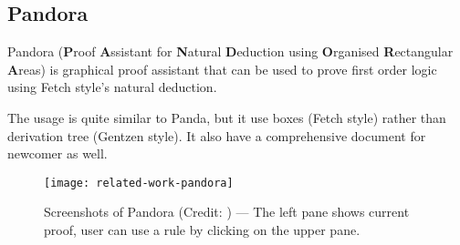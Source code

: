 \documentclass[master.tex]{subfiles}
\begin{document}
\newpage

\subsection{Pandora}
Pandora\supercite{pandora-official-website}\supercite{Broda2007PandoraAR}
(\textbf{P}roof \textbf{A}ssistant for \textbf{N}atural \textbf{D}eduction using
\textbf{O}rganised \textbf{R}ectangular \textbf{A}reas) is graphical proof
assistant that can be used to prove first order logic using Fetch style's
natural deduction.

The usage is quite similar to Panda, but it use boxes (Fetch style) rather than
derivation tree (Gentzen style). It also have a comprehensive document for
newcomer as well.

\begin{figure}[H]
    \centering
    \texttt{[image: related-work-pandora]}
    \caption{Screenshots of Pandora (Credit: \cite{Broda2007PandoraAR}) ---
      The left pane shows current proof, user can use a rule by clicking on the
      upper pane.}
\label{fig:related-work-pandora}
\end{figure}
\end{document}
